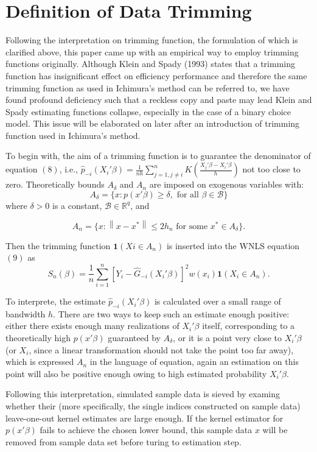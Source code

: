 \documentclass[a4paper]{article}
\newcommand{\norm}[1]{\left\lVert#1\right\rVert}
\begin{document}
\section{Definition of Data Trimming}
Following the interpretation on trimming function, the formulation of which is clarified above, this paper came up with an empirical way to employ trimming functions originally. Although Klein and Spady (1993) states that a trimming function has insignificant effect on efficiency performance and therefore the same trimming function as used in Ichimura's method can be referred to, we have found profound deficiency such that a reckless copy and paste may lead Klein and Spady estimating functions collapse, especially in the case of a binary choice model. This issue will be elaborated on later after an introduction of trimming function used in Ichimura's method.

To begin with, the aim of a trimming function is to guarantee the denominator of equation $(8)$, i.e., $\hat{p}_{-i}(X_i'\beta) = \frac{1}{nh}\sum_{j=1,j \neq i}^{n}K(\frac{X_j'\beta - X_i'\beta}{h})$ not too close to zero. Theoretically bounds $A_\delta$ and $A_n$ are imposed on exogenous variables with:
\[ A_\delta = \{ x : p(x'\beta) \geq \delta, \text{ for all }  \beta \in \mathcal{B} \}
\]
where $\delta > 0$ is a constant, $\mathcal{B} \in \mathbb{R}^q$, and

\[ A_n = \{ x : \norm{x - x^*} \leq 2h_n \text{ for some } x^* \in A_\delta\}.
\]

Then the trimming function $\mathbf{1}{(Xi \in A_n)}$ is inserted into the WNLS equation $(9)$ as
\[
S_n(\beta) = \frac{1}{n} \sum_{i=1}^{n}  [Y_i - \hat{G}_{-i}(X_i'\beta)]^2w(x_i)\mathbf{1}{(X_i \in A_n)}.
\]

To interprete, the estimate $\hat{p}_{-i}(X_i'\beta)$ is calculated over a small range of bandwidth $h$. There are two ways to keep such an estimate enough positive: either there exists enough many realizations of $X_i'\beta$ itself, corresponding to a theoretically high $p(x'\beta)$ guaranteed by $A_\delta$, or it is a point very close to $X_i'\beta$ (or $X_i$, since a linear transformation should not take the point too far away), which is expressed $A_n$ in the language of equation, again an estimation on this point will also be positive enough owing to high estimated probability $X_i'\beta$.

Following this interpretation, simulated sample data is sieved by examing whether their (more specifically, the single indices constructed on sample data) leave-one-out kernel estimates are large enough. If the kernel estimator for $p(x'\beta)$ fails to achieve the chosen lower bound, this sample data $x$ will be removed from sample data set before turing to estimation step.
\end{document}
